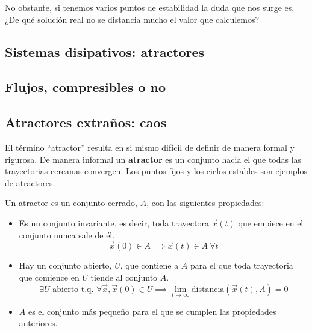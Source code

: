 No obstante, si tenemos varios puntos de estabilidad la duda que nos surge es, ¿De qué solución real no se distancia mucho el valor que calculemos?

\subsection{Sistemas disipativos: atractores}
\subsection{Flujos, compresibles o no}

\subsection{Atractores extraños: caos}
El término ``atractor'' resulta en si mismo difícil de definir de manera formal y rigurosa. De manera informal un \textbf{atractor} es un conjunto hacia el que todas las trayectorias cercanas convergen. Los puntos fijos y los ciclos estables son ejemplos de atractores.

\begin{definition}[Atractor]
Un atractor es un conjunto cerrado, $A$, con las siguientes propiedades:
\begin{itemize}
\item Es un conjunto invariante, es decir, toda trayectora $\vec{x}(t)$ que empiece en el conjunto nunca sale de él.
\[\vec{x}(0) \in A \implies \vec{x}(t) \in A \ \forall t\]
\item Hay un conjunto abierto, $U$, que contiene a $A$ para el que toda trayectoria que comience en $U$ tiende al conjunto $A$.
\[\exists U \text{ abierto t.q. } \forall \vec{x}, \vec{x}(0) \in U \implies \lim_{t\to \infty}\text{distancia}(\vec{x}(t),A) = 0\]
\item $A$ es el conjunto más pequeño para el que se cumplen las propiedades anteriores.
\end{itemize}
\end{definition}

